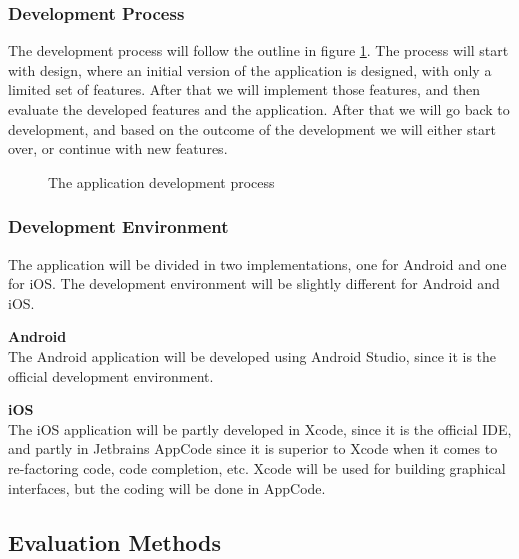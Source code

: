 \documentclass[12pt, a4paper, onecolumn]{article}
\newcommand{\parag}[1]{
	\textbf{#1} \hspace{0pt} \\
}
\begin{document}
	\subsubsection{Development Process}
	
	The development process will follow the outline in figure \ref{fig:development}. The process will start with design, where an initial version of the application is designed, with only a limited set of features. After that we will implement those features, and then evaluate the developed features and the application. After that we will go back to development, and based on the outcome of the development we will either start over, or continue with new features.
	
	\begin{figure}[H]
		\centering
		\caption{The application development process}%
		\label{fig:development}%
	\end{figure}
	
	\subsubsection{Development Environment}
	
	The application will be divided in two implementations, one for Android and one for iOS. The development environment will be slightly different for Android and iOS. 
	
	\parag{Android}
	The Android application will be developed using Android Studio, since it is the official development environment.
	
	\parag{iOS}
	The iOS application will be partly developed in Xcode, since it is the official IDE, and partly in Jetbrains AppCode since it is superior to Xcode when it comes to re-factoring code, code completion, etc. Xcode will be used for building graphical interfaces, but the coding will be done in AppCode.
	
	\subsection{Evaluation Methods}
	
\end{document}
